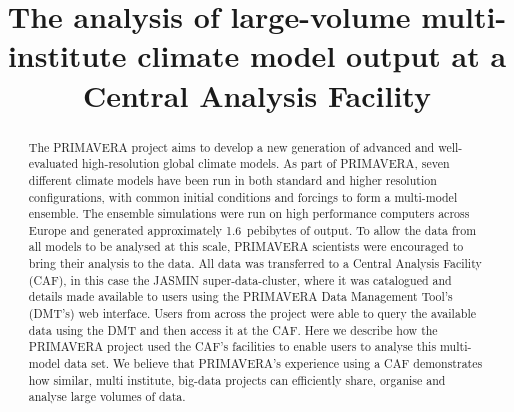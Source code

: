 \documentclass[gmd, manuscript]{copernicus}
\begin{document}
\title{The analysis of large-volume multi-institute climate model output at a Central Analysis Facility}













\received{}
\pubdiscuss{} %
\revised{}
\accepted{}
\published{}




\maketitle



\begin{abstract}
The PRIMAVERA project aims to develop a new generation of advanced and well-evaluated high-resolution global climate models. As part of PRIMAVERA, seven different climate models have been run in both standard and higher resolution configurations, with common initial conditions and forcings to form a multi-model ensemble. The ensemble simulations were run on high performance computers across Europe and generated approximately 1.6~pebibytes of output. To allow the data from all models to be analysed at this scale, PRIMAVERA scientists were encouraged to bring their analysis to the data. All data was transferred to a Central Analysis Facility (CAF), in this case the JASMIN super-data-cluster, where it was catalogued and details made available to users using the PRIMAVERA Data Management Tool's (DMT's) web interface. Users from across the project were able to query the available data using the DMT and then access it at the CAF. Here we describe how the PRIMAVERA project used the CAF's facilities to enable users to analyse this multi-model data set. We believe that PRIMAVERA's experience using a CAF demonstrates how similar, multi institute, big-data projects can efficiently share, organise and analyse large volumes of data.
\end{abstract}
\end{document}
